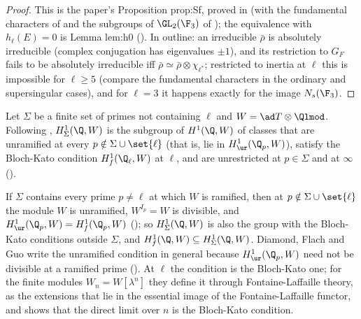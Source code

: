 \begin{proof}
This is the paper's Proposition prop:Sf, proved in  (with the fundamental characters of  and the subgroups of $\GL_2(\F_3)$ of );
the equivalence with $h_\ell(E)=0$ is Lemma lem:h0 (). In outline: an irreducible $\bar\rho$ is absolutely irreducible (complex conjugation has eigenvalues $\pm1$), and its
restriction to $G_F$ fails to be absolutely irreducible iff $\bar\rho\simeq\bar\rho\otimes\chi_{\ell^*}$; restricted to inertia at $\ell$ this is impossible for $\ell\ge5$ (compare the fundamental
characters in the ordinary and supersingular cases), and for $\ell=3$ it happens exactly for the image $N_s(\F_3)$.
\end{proof}

\begin{definition}\label{def:congruence:selmer-sigma}
Let $\Sigma$ be a finite set of primes not containing $\ell$ and $W=\ad T\otimes\Qlmod$. Following \cite[Section 2.1]{DFG04}, $H^1_\Sigma(\Q,W)$ is the subgroup of $H^1(\Q,W)$ of classes that are
unramified at every $p\notin\Sigma\cup\set{\ell}$ (that is, lie in $H^1_{\ur}(\Q_p,W)$), satisfy the Bloch-Kato condition $H^1_f(\Q_\ell,W)$ at $\ell$, and are unrestricted at $p\in\Sigma$ and at $\infty$ ().
\end{definition}

If $\Sigma$ contains every prime $p\ne\ell$ at which $W$ is ramified, then at $p\notin\Sigma\cup\set{\ell}$ the module $W$ is unramified, $W^{I_p}=W$ is divisible, and $H^1_{\ur}(\Q_p,W)=H^1_f(\Q_p,W)$
(); so $H^1_\Sigma(\Q,W)$ is also the group with the Bloch-Kato conditions outside $\Sigma$, and $H^1_f(\Q,W)\subseteq H^1_\Sigma(\Q,W)$. Diamond, Flach and Guo write the unramified condition
in general because $H^1_{\ur}(\Q_p,W)$ need not be divisible at a ramified prime (). At $\ell$ the condition is the Bloch-Kato one; for the finite modules $W_n=W[\lambda^n]$ they define it through Fontaine-Laffaille theory,
as the extensions that lie in the essential image of the Fontaine-Laffaille functor, and \cite[Proposition 2.2]{DFG04} shows that the direct limit over $n$ is the Bloch-Kato condition.

